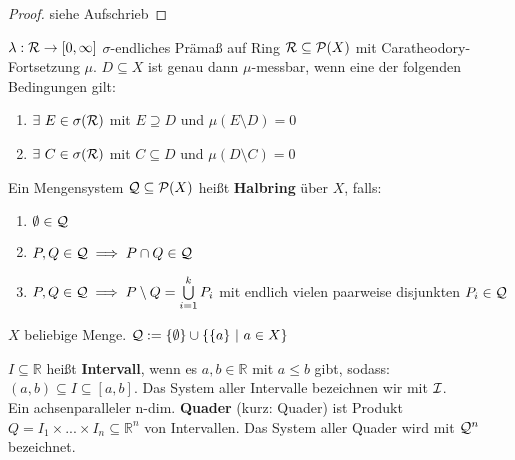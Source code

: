 \documentclass[11pt,a4paper,fleqn,openany]{report}
\begin{document}
    \begin{proof}
      siehe Aufschrieb
    \end{proof}

    \newpage

    \begin{lemma}[i.A. II.17]
      $\lambda: \mathcal{R} \to [0, \infty]$ $\sigma$-endliches Prämaß auf Ring $\mathcal{R} \subseteq \mathcal{P}(X)$ mit Caratheodory-Fortsetzung $\mu$. $D \subseteq X$ ist genau dann $\mu$-messbar, wenn eine der folgenden Bedingungen gilt:
      \begin{enumerate}[label=\roman*)]
        \item $\exists \ E \in \sigma(\mathcal{R})$ mit $E \supseteq D$ und $\mu(E \setminus D) = 0$
        \item $\exists \ C \in \sigma(\mathcal{R})$ mit $C \subseteq D$ und $\mu(D \setminus C) = 0$
      \end{enumerate}
    \end{lemma}

    \begin{definition}
      Ein Mengensystem $\mathcal{Q} \subseteq \mathcal{P}(X)$ heißt \textbf{Halbring} über $X$, falls:
      \begin{enumerate}[label=\roman*)]
        \item $\emptyset \in \mathcal{Q}$
        \item $P, Q \in \mathcal{Q} \implies P \cap Q \in \mathcal{Q}$
        \item $P, Q \in \mathcal{Q} \implies P \setminus Q = \bigcup\limits_{i=1}^k P_i$ mit endlich vielen paarweise disjunkten $P_i \in \mathcal{Q}$
      \end{enumerate}
    \end{definition}

    \begin{example}
      $X$ beliebige Menge. $\mathcal{Q} := \{\emptyset\} \cup \{\{a\} \ | \ a \in X\}$
    \end{example}

    \begin{remark}
      $I \subseteq \mathbb{R}$ heißt \textbf{Intervall}, wenn es $a,b \in \mathbb{R}$ mit $a \leq b$ gibt, sodass: $(a,b) \subseteq I \subseteq [a,b]$. Das System aller Intervalle bezeichnen wir mit $\mathcal{I}$.\\
      Ein achsenparalleler n-dim. \textbf{Quader} (kurz: Quader) ist Produkt $Q = I_1 \times ... \times I_n \subseteq \mathbb{R}^n$ von Intervallen. Das System aller Quader wird mit $\mathcal{Q}^n$ bezeichnet.
    \end{remark}
\end{document}
